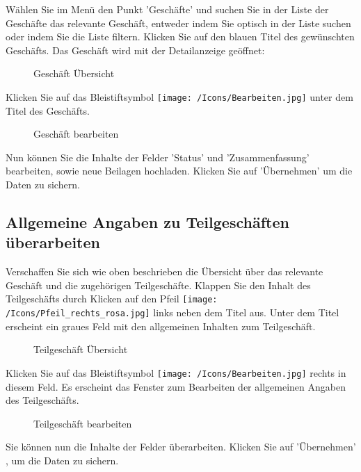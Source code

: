 Wählen Sie im Menü den Punkt 'Geschäfte' und suchen Sie in der Liste der Geschäfte das relevante Geschäft, entweder indem Sie optisch in der Liste suchen oder indem Sie die Liste filtern. Klicken Sie auf den blauen Titel des gewünschten Geschäfts. Das Geschäft wird mit der Detailanzeige geöffnet:

\begin{figure}[H]
\caption{Geschäft Übersicht}
\end{figure}

Klicken Sie auf das Bleistiftsymbol \texttt{[image: /Icons/Bearbeiten.jpg]}  unter dem Titel des Geschäfts.

\begin{figure}[H]
\caption{Geschäft bearbeiten}
\end{figure}

Nun können Sie die Inhalte der Felder 'Status'  und 'Zusammenfassung'  bearbeiten, sowie neue Beilagen  hochladen. Klicken Sie auf 'Übernehmen'  um die Daten zu sichern.

\subsection{Allgemeine Angaben zu Teilgeschäften überarbeiten}

Verschaffen Sie sich wie oben beschrieben die Übersicht über das relevante Geschäft und die zugehörigen Teilgeschäfte. Klappen Sie den Inhalt des Teilgeschäfts durch Klicken auf den Pfeil \texttt{[image: /Icons/Pfeil\_rechts\_rosa.jpg]} links neben dem Titel aus. Unter dem Titel erscheint ein graues Feld  mit den allgemeinen Inhalten zum Teilgeschäft.

\begin{figure}[H]
\caption{Teilgeschäft Übersicht}
\end{figure}

Klicken Sie auf das Bleistiftsymbol \texttt{[image: /Icons/Bearbeiten.jpg]}  rechts in diesem Feld. Es erscheint das Fenster zum Bearbeiten der allgemeinen Angaben des Teilgeschäfts.

\begin{figure}[H]
\caption{Teilgeschäft bearbeiten}
\end{figure}

Sie können nun die Inhalte der Felder überarbeiten. Klicken Sie auf 'Übernehmen' , um die Daten zu sichern.
